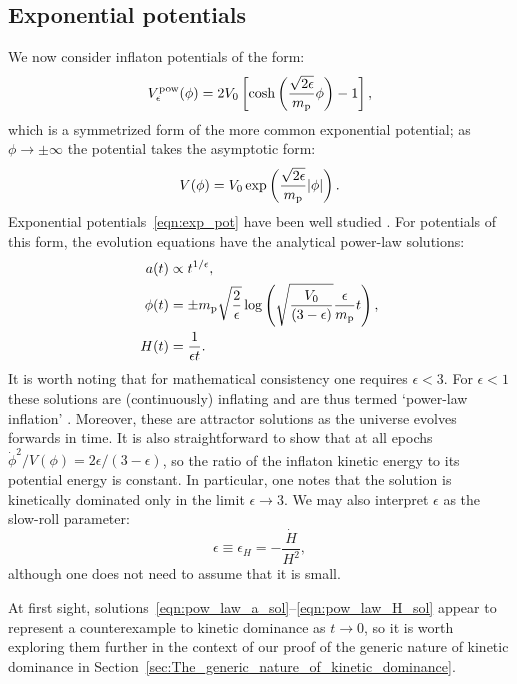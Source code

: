 \subsection{Exponential potentials}
\label{sec:Exponential_potentials}
We now consider inflaton potentials of the form:
\begin{equation}
  V^\mathrm{pow}_\epsilon(\phi) 
  = 
  2V_0\left[
  \cosh\left(\frac{\sqrt{2\epsilon}}{m_{\mathrm{p}}}\phi\right)-1
  \right],
  \label{eqn:coshpot}
\end{equation}
which is a symmetrized form of the more common exponential potential; as \(\phi\rightarrow\pm\infty\) the potential takes the asymptotic form:
\begin{equation}
  V(\phi) 
  = 
  V_0 \exp\left(\frac{\sqrt{2\epsilon}}{m_{\mathrm{p}}} |\phi|\right).
  \label{eqn:exp_pot}
\end{equation}
Exponential potentials~\eqref{eqn:exp_pot} have been well studied \citep{yokoyama_dynamics_1988}. For potentials of this form, the evolution equations have the analytical power-law solutions:
\begin{align}
  a(t) 
  &\propto 
  {t}^{1/\epsilon},
  \label{eqn:pow_law_a_sol}
  \\
  \phi(t)
  &=
  \pm m_{\mathrm{p}}\sqrt{\frac{2}{\epsilon}}
  \log\left(\sqrt{\frac{V_0}{\left(3-\epsilon\right)}}
  \frac{\epsilon}{m_{\mathrm{p}}} t\right),
  \\
  H(t)
  &=
  \frac{1}{\epsilon t}.  
  \label{eqn:pow_law_H_sol}
\end{align}
It is worth noting that for mathematical consistency one requires \(\epsilon < 3\). For \(\epsilon<1\) these solutions are (continuously) inflating and are thus termed `power-law inflation' \citep{lucchin_power-law_1985}. Moreover, these are attractor solutions as the universe evolves forwards in time. It is also straightforward to show that at all epochs \(\dot{\phi}^2/V(\phi) = 2\epsilon/(3-\epsilon)\), so the ratio of the inflaton kinetic energy to its potential energy is constant. In particular, one notes that the solution is kinetically dominated only in the limit \(\epsilon \to 3\).  We may also interpret \(\epsilon\) as the slow-roll parameter:
\begin{equation}
  \epsilon\equiv\epsilon_H = -\frac{\dot{H}}{H^2},
\end{equation}
although one does not need to assume that it is small.

At first sight, solutions~\eqref{eqn:pow_law_a_sol}--\eqref{eqn:pow_law_H_sol} appear to represent a counterexample to kinetic dominance as \(t \to 0\), so it is worth exploring them further in the context of our proof of the generic nature of kinetic dominance in Section~\ref{sec:The_generic_nature_of_kinetic_dominance}. 

